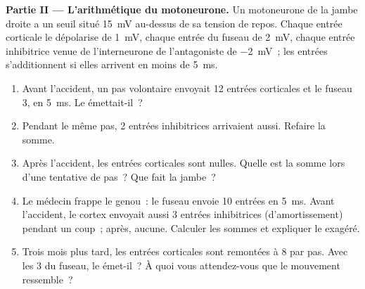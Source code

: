 \begin{problem}
\medskip
\noindent\textbf{Partie II --- L'arithmétique du motoneurone.}
Un motoneurone de la jambe droite a un seuil situé \qty{15}{mV}
au-dessus de sa tension de repos. Chaque entrée corticale le
dépolarise de \qty{1}{mV}, chaque entrée du fuseau de \qty{2}{mV},
chaque entrée inhibitrice venue de l'interneurone de l'antagoniste de
\qty{-2}{mV}~; les entrées s'additionnent si elles arrivent en moins
de \qty{5}{ms}.
\begin{enumerate}[resume]
  \item Avant l'accident, un pas volontaire envoyait 12 entrées
        corticales et le fuseau 3, en \qty{5}{ms}. Le 
        émettait-il~?
  \item Pendant le même pas, 2 entrées inhibitrices arrivaient aussi.
        Refaire la somme.
  \item Après l'accident, les entrées corticales sont nulles. Quelle
        est la somme lors d'une tentative de pas~? Que fait la jambe~?
  \item Le médecin frappe le genou~: le fuseau envoie 10 entrées en
        \qty{5}{ms}. Avant l'accident, le cortex envoyait aussi 3
        entrées inhibitrices (d'amortissement) pendant un coup~;
        après, aucune. Calculer les sommes et expliquer le 
        exagéré.
  \item Trois mois plus tard, les entrées corticales sont remontées à
        8 par pas. Avec les 3 du fuseau, le  émet-il~? À quoi
        vous attendez-vous que le mouvement ressemble~?
\end{enumerate}


\end{problem}
